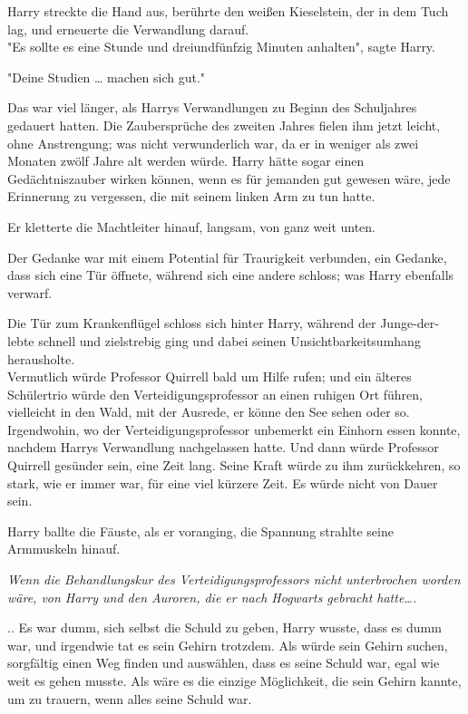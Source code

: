 {Harry streckte die Hand aus, berührte den weißen Kieselstein, der in dem Tuch lag, und erneuerte die Verwandlung darauf.\\ "Es sollte es eine Stunde und dreiundfünfzig Minuten anhalten", sagte Harry.

"Deine Studien … machen sich gut."

Das war viel länger, als Harrys Verwandlungen zu Beginn des Schuljahres gedauert hatten. Die Zaubersprüche des zweiten Jahres fielen ihm jetzt leicht, ohne Anstrengung; was nicht verwunderlich war, da er in weniger als zwei Monaten zwölf Jahre alt werden würde. Harry hätte sogar einen Gedächtniszauber wirken können, wenn es für jemanden gut gewesen wäre, jede Erinnerung zu vergessen, die mit seinem linken Arm zu tun hatte.

Er kletterte die Machtleiter hinauf, langsam, von ganz weit unten.

Der Gedanke war mit einem Potential für Traurigkeit verbunden, ein Gedanke, dass sich eine Tür öffnete, während sich eine andere schloss; was Harry ebenfalls verwarf.

Die Tür zum Krankenflügel schloss sich hinter Harry, während der Junge-der-lebte schnell und zielstrebig ging und dabei seinen Unsichtbarkeitsumhang herausholte.\\ Vermutlich würde Professor Quirrell bald um Hilfe rufen; und ein älteres Schülertrio würde den Verteidigungsprofessor an einen ruhigen Ort führen, vielleicht in den Wald, mit der Ausrede, er könne den See sehen oder so. Irgendwohin, wo der Verteidigungsprofessor unbemerkt ein Einhorn essen konnte, nachdem Harrys Verwandlung nachgelassen hatte. Und dann würde Professor Quirrell gesünder sein, eine Zeit lang. Seine Kraft würde zu ihm zurückkehren, so stark, wie er immer war, für eine viel kürzere Zeit. Es würde nicht von Dauer sein.

Harry ballte die Fäuste, als er voranging, die Spannung strahlte seine Armmuskeln hinauf.

\emph{Wenn die Behandlungskur des Verteidigungsprofessors nicht unterbrochen worden wäre, von Harry und den Auroren, die er nach Hogwarts gebracht hatte….}

.. Es war dumm, sich selbst die Schuld zu geben, Harry wusste, dass es dumm war, und irgendwie tat es sein Gehirn trotzdem. Als würde sein Gehirn suchen, sorgfältig einen Weg finden und auswählen, dass es seine Schuld war, egal wie weit es gehen musste. Als wäre es die einzige Möglichkeit, die sein Gehirn kannte, um zu trauern, wenn alles seine Schuld war.

}
